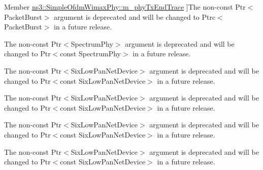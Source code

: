 \begin{DoxyRefList}
\hypertarget{deprecated__deprecated000038}{}%
Member \hyperlink{classns3_1_1SimpleOfdmWimaxPhy_a25cc58eaaab4ca6692c29140562c709c}{ns3\+:\+:Simple\+Ofdm\+Wimax\+Phy\+:\+:m\+\_\+phy\+Tx\+End\+Trace} ]The non-\/const {\ttfamily Ptr$<$\+Packet\+Burst$>$} argument is deprecated and will be changed to {\ttfamily Ptrc$<$\+Packet\+Burst$>$} in a future release.  
\item[\label{deprecated__deprecated000032}%
\hypertarget{deprecated__deprecated000032}{}%
Member \hyperlink{classns3_1_1SingleModelSpectrumChannel_ac20ae2c0f27bed879388820857b97599}{ns3\+:\+:Single\+Model\+Spectrum\+Channel\+:\+:m\+\_\+path\+Loss\+Trace} ]The non-\/const {\ttfamily Ptr$<$\+Spectrum\+Phy$>$} argument is deprecated and will be changed to {\ttfamily Ptr$<$const Spectrum\+Phy$>$} in a future release.  
\item[\label{deprecated__deprecated000027}%
\hypertarget{deprecated__deprecated000027}{}%
Member \hyperlink{classns3_1_1SixLowPanNetDevice_ac6dcccf6a63766b5d04614f72109375f}{ns3\+:\+:Six\+Low\+Pan\+Net\+Device\+:\+:Drop\+Traced\+Callback} )(Drop\+Reason reason, Ptr$<$ const Packet $>$ packet, Ptr$<$ Six\+Low\+Pan\+Net\+Device $>$ six\+Net\+Device, uint32\+\_\+t ifindex)]The non-\/const {\ttfamily Ptr$<$\+Six\+Low\+Pan\+Net\+Device$>$} argument is deprecated and will be changed to {\ttfamily Ptr$<$const Six\+Low\+Pan\+Net\+Device$>$} in a future release.  
\item[\label{deprecated__deprecated000030}%
\hypertarget{deprecated__deprecated000030}{}%
Member \hyperlink{classns3_1_1SixLowPanNetDevice_a93e0ef7a17057bcb8420b8d37ec56356}{ns3\+:\+:Six\+Low\+Pan\+Net\+Device\+:\+:m\+\_\+drop\+Trace} ]The non-\/const {\ttfamily Ptr$<$\+Six\+Low\+Pan\+Net\+Device$>$} argument is deprecated and will be changed to {\ttfamily Ptr$<$const Six\+Low\+Pan\+Net\+Device$>$} in a future release.  
\item[\label{deprecated__deprecated000029}%
\hypertarget{deprecated__deprecated000029}{}%
Member \hyperlink{classns3_1_1SixLowPanNetDevice_a868eb6580b5eced376dadafa67aeda6b}{ns3\+:\+:Six\+Low\+Pan\+Net\+Device\+:\+:m\+\_\+rx\+Trace} ]The non-\/const {\ttfamily Ptr$<$\+Six\+Low\+Pan\+Net\+Device$>$} argument is deprecated and will be changed to {\ttfamily Ptr$<$const Six\+Low\+Pan\+Net\+Device$>$} in a future release.  
\item[\label{deprecated__deprecated000028}%
\hypertarget{deprecated__deprecated000028}{}%
Member \hyperlink{classns3_1_1SixLowPanNetDevice_a6d80896d0b58fd8a5577c65a060ad3b1}{ns3\+:\+:Six\+Low\+Pan\+Net\+Device\+:\+:m\+\_\+tx\+Trace} ]The non-\/const {\ttfamily Ptr$<$\+Six\+Low\+Pan\+Net\+Device$>$} argument is deprecated and will be changed to {\ttfamily Ptr$<$const Six\+Low\+Pan\+Net\+Device$>$} in a future release.  

\end{DoxyRefList}
